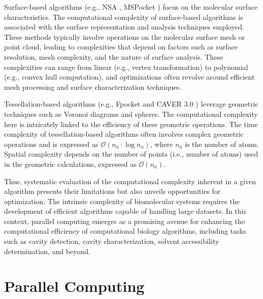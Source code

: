 \documentclass[Ingles]{phdthesis}
\def\ie{i.e.\onedot}
\def\eg{e.g.\onedot}
\begin{document}
Surface-based algorithms (\eg, NSA \cite{nsa}, MSPocket \cite{mspocket}) focus on the molecular surface characteristics. The computational complexity of surface-based algorithms is associated with the surface representation and analysis techniques employed. These methods typically involve operations on the molecular surface mesh or point cloud, leading to complexities that depend on factors such as surface resolution, mesh complexity, and the nature of surface analysis. These complexities can range from linear (\eg, vertex transformation) to polynomial (\eg, convex hull computation), and optimizations often revolve around efficient mesh processing and surface characterization techniques.

Tessellation-based algorithms (\eg, Fpocket \cite{fpocket} and CAVER 3.0 \cite{caver3}) leverage geometric techniques such as Voronoi diagrams and \textalpha\space spheres. The computational complexity here is intricately linked to the efficiency of these geometric operations. The time complexity of tessellation-based algorithms often involves complex geometric operations and is expressed as $\mathcal{O}(n_{a} \cdot \log{n_{a}})$, where $n_{a}$ is the number of atoms. Spatial complexity depends on the number of points (\ie, number of atoms) used in the geometric calculations, expressed as $\mathcal{O}(n_{a})$.

Thus, systematic evaluation of the computational complexity inherent in a given algorithm presents their limitations but also unveils opportunities for optimization. The intrinsic complexity of biomolecular systems requires the development of efficient algorithms capable of handling large datasets. In this context, parallel computing emerges as a promising avenue for enhancing the computational efficiency of computational biology algorithms, including tasks such as cavity detection, cavity characterization, solvent accessibility determination, and beyond.

\section{Parallel Computing \label{sec:parallel-computing}}
\end{document}
